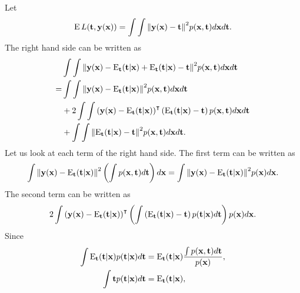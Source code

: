 \subsection{}
\label{1.26}
Let
%
\begin{equation}
\operatorname{E} L(\mathbf{t}, \mathbf{y} (\mathbf{x})) 
= 
\int 
\int 
\norm{\mathbf{y}(\mathbf{x}) - \mathbf{t}} ^ 2 
p(\mathbf{x}, \mathbf{t}) 
d\mathbf{x} 
d\mathbf{t}.
\end{equation}
%
The right hand side can be written as
%
\begin{equation}
\begin{aligned}
&
\int 
\int \norm{\mathbf{y}(\mathbf{x}) - \operatorname{E}_\mathbf{t} (\mathbf{t} | \mathbf{x}) + \operatorname{E}_\mathbf{t} (\mathbf{t} | \mathbf{x}) - \mathbf{t}} ^ 2 
p(\mathbf{x}, \mathbf{t}) 
d\mathbf{x} 
d\mathbf{t} \\ 
=& 
\int 
\int \norm{\mathbf{y}(\mathbf{x}) - \operatorname{E}_\mathbf{t} (\mathbf{t} | \mathbf{x})} ^ 2 p(\mathbf{x}, \mathbf{t}) 
d\mathbf{x} 
d\mathbf{t} \\
&+ 
2 
\int 
\int 
\left( 
	\mathbf{y}(\mathbf{x}) 
	- 
	\operatorname{E}_\mathbf{t} (\mathbf{t} | \mathbf{x}) 
\right) ^ \intercal 
\left( 
	\operatorname{E}_\mathbf{t} (\mathbf{t} | \mathbf{x}) 
	- 
	\mathbf{t} 
\right) 
p(\mathbf{x}, \mathbf{t}) 
d\mathbf{x} 
d\mathbf{t} \\
&+ 
\int 
\int 
\norm{\operatorname{E}_\mathbf{t} (\mathbf{t} | \mathbf{x}) - \mathbf{t}} ^ 2 
p(\mathbf{x}, \mathbf{t}) 
d\mathbf{x} 
d\mathbf{t}.
\end{aligned}
\end{equation}
%
Let us look at each term of the right hand side.
The first term can be written as
%
\begin{equation}
\int 
\norm{\mathbf{y}(\mathbf{x}) - \operatorname{E}_\mathbf{t} (\mathbf{t} | \mathbf{x})} ^ 2 \left( 
	\int 
	p(\mathbf{x}, \mathbf{t}) 
	d\mathbf{t} 
\right) 
d\mathbf{x} 
= 
\int 
\norm{\mathbf{y}(\mathbf{x}) - \operatorname{E}_\mathbf{t} (\mathbf{t} | \mathbf{x})} ^ 2 p(\mathbf{x}) 
d\mathbf{x}.
\end{equation}
%
The second term can be written as
%
\begin{equation}
2 
\int 
\left( 
	\mathbf{y}(\mathbf{x}) 
	- 
	\operatorname{E}_\mathbf{t} (\mathbf{t} | \mathbf{x}) 
\right) ^ \intercal 
\left( 
	\int 
	\left( 
		\operatorname{E}_\mathbf{t} (\mathbf{t} | \mathbf{x}) - \mathbf{t} 
	\right) 
	p(\mathbf{t} | \mathbf{x}) 
	d\mathbf{t} 
\right) 
p(\mathbf{x}) 
d\mathbf{x}.
\end{equation}
%
Since
%
\begin{equation}
\begin{aligned}
\int 
\operatorname{E}_\mathbf{t} (\mathbf{t} | \mathbf{x}) 
p(\mathbf{t} | \mathbf{x}) 
d\mathbf{t} 
&= 
\operatorname{E}_\mathbf{t} (\mathbf{t} | \mathbf{x}) 
\frac
{\int p(\mathbf{x}, \mathbf{t}) d\mathbf{t}}
{p(\mathbf{x})}, \\
\int 
\mathbf{t} 
p(\mathbf{t} | \mathbf{x}) 
d\mathbf{t} 
&= 
\operatorname{E}_\mathbf{t} (\mathbf{t} | \mathbf{x}),
\end{aligned}
\end{equation}
